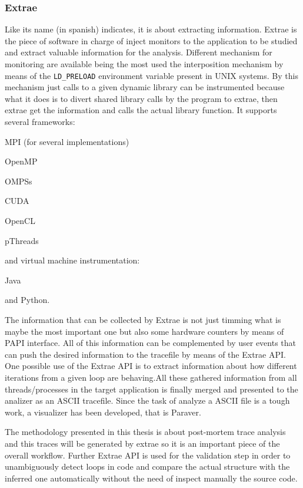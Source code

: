 \subsubsection{Extrae}

Like its name (in spanish) indicates, it is about extracting information. Extrae is
the piece of software in charge of inject monitors to the application to
be studied and
extract valuable information for the analysis. Different mechanism for
monitoring are available being the most used the interposition mechanism by
means of the {\tt LD\_PRELOAD} environment variable present in UNIX systems.
By this mechanism just calls to a given dynamic library can be instrumented because
what it does is to divert shared library calls by the program to extrae, then 
extrae get the information and calls the actual library function. It supports 
several frameworks: 
\begin{enumerate*}[label=\roman*)]
  \item MPI (for several implementations)
  \item OpenMP
  \item OMPSs
  \item CUDA
  \item OpenCL
  \item pThreads
\end{enumerate*}
and virtual machine instrumentation: 
\begin{enumerate*}[label=\roman*)]
  \item Java
  \item and Python.
\end{enumerate*}
The information that can be collected by Extrae is not just timming what is maybe
the most important one but also some hardware counters by means of PAPI
interface. All of this information can be complemented by user events that can
push the desired information to the tracefile by means of the Extrae API. One
possible use of the Extrae API is to extract information about how different
iterations from a given loop are behaving.All these gathered information from 
all threads/processes in the target application is finally merged and presented 
to the analizer as an ASCII tracefile. Since the task of analyze a ASCII file 
is a tough work, a visualizer has been developed, that is Paraver.

The methodology presented in this thesis is about post-mortem trace analysis and
this traces will be generated by extrae so it is an important piece of the
overall workflow. Further Extrae API is used for the validation step in order to
unambiguously detect loops in code and compare the actual structure with the
inferred one automatically without the need of inspect manually the source code.


